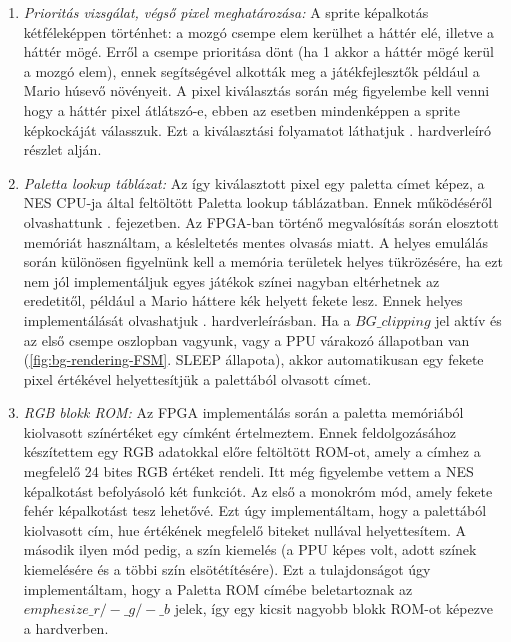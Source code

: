 	\begin{enumerate}
		\item \emph{Prioritás vizsgálat, végső pixel meghatározása:} A sprite képalkotás kétféleképpen történhet: a mozgó csempe elem kerülhet a háttér elé, illetve a háttér mögé. Erről a csempe prioritása dönt (ha 1 akkor a háttér mögé kerül a mozgó elem), ennek segítségével alkották meg a játékfejlesztők például a Mario húsevő növényeit. A pixel kiválasztás során még figyelembe kell venni hogy a háttér pixel átlátszó-e, ebben az esetben mindenképpen a sprite képkockáját válasszuk. Ezt a kiválasztási folyamatot láthatjuk . hardverleíró részlet alján.
		\item \emph{Paletta lookup táblázat:} Az így kiválasztott pixel egy paletta címet képez, a NES CPU-ja által feltöltött Paletta lookup táblázatban. Ennek működéséről olvashattunk . fejezetben. Az FPGA-ban történő megvalósítás során elosztott memóriát használtam, a késleltetés mentes olvasás miatt. A helyes emulálás során különösen figyelnünk kell a memória területek helyes tükrözésére, ha ezt nem jól implementáljuk egyes játékok színei nagyban eltérhetnek az eredetitől, például a Mario háttere kék helyett fekete lesz. Ennek helyes implementálását olvashatjuk . hardverleírásban. Ha a $BG\_clipping$ jel aktív és az első csempe oszlopban vagyunk, vagy a PPU várakozó állapotban van (\ref{fig:bg-rendering-FSM}. SLEEP állapota), akkor automatikusan egy fekete pixel értékével helyettesítjük a palettából olvasott címet.
		\item \emph{RGB blokk ROM:} Az FPGA implementálás során a paletta memóriából kiolvasott színértéket egy címként értelmeztem. Ennek feldolgozásához készítettem egy RGB adatokkal előre feltöltött ROM-ot, amely a címhez a megfelelő 24 bites RGB értéket rendeli. Itt még figyelembe vettem a NES képalkotást befolyásoló két funkciót. Az első a monokróm mód, amely fekete fehér képalkotást tesz lehetővé. Ezt úgy implementáltam, hogy a palettából kiolvasott cím, hue értékének megfelelő biteket nullával helyettesítem. A második ilyen mód pedig, a szín kiemelés (a PPU képes volt, adott színek kiemelésére és a többi szín elsötétítésére). Ezt a tulajdonságot úgy implementáltam, hogy a Paletta ROM címébe beletartoznak az $emphesize\_r / -\_g / -\_b$ jelek, így egy kicsit nagyobb blokk ROM-ot képezve a hardverben.
	\end{enumerate} 
	
